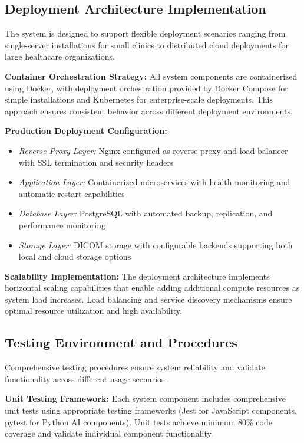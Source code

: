 \subsection{Deployment Architecture Implementation}

The system is designed to support flexible deployment scenarios ranging from single-server installations for small clinics to distributed cloud deployments for large healthcare organizations.

\textbf{Container Orchestration Strategy:} All system components are containerized using Docker, with deployment orchestration provided by Docker Compose for simple installations and Kubernetes for enterprise-scale deployments. This approach ensures consistent behavior across different deployment environments.

\textbf{Production Deployment Configuration:}
\begin{itemize}
    \item \textit{Reverse Proxy Layer:} Nginx configured as reverse proxy and load balancer with SSL termination and security headers
    \item \textit{Application Layer:} Containerized microservices with health monitoring and automatic restart capabilities
    \item \textit{Database Layer:} PostgreSQL with automated backup, replication, and performance monitoring
    \item \textit{Storage Layer:} DICOM storage with configurable backends supporting both local and cloud storage options
\end{itemize}

\textbf{Scalability Implementation:} The deployment architecture implements horizontal scaling capabilities that enable adding additional compute resources as system load increases. Load balancing and service discovery mechanisms ensure optimal resource utilization and high availability.

\subsection{Testing Environment and Procedures}

Comprehensive testing procedures ensure system reliability and validate functionality across different usage scenarios.

\textbf{Unit Testing Framework:} Each system component includes comprehensive unit tests using appropriate testing frameworks (Jest for JavaScript components, pytest for Python AI components). Unit tests achieve minimum 80\% code coverage and validate individual component functionality.


